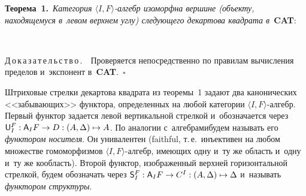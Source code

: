 \begin{multicols}{2}
  \smallskip
  
  \noindent
  \textbf{Теорема~1.}\ \textit{Категория $\langle I, F\rangle$-ал\-гебр 
изоморфна вершине (объекту, находящемуся в~левом верх\-нем углу) 
сле\-ду\-юще\-го декартова квад\-ра\-та в}~\textbf{CAT}:
  \vspace*{1pt}
  \begin{center}  
    \mbox{%
\epsfxsize=28.493mm
}

\end{center}
  
  \noindent
  Д\,о\,к\,а\,з\,а\,т\,е\,л\,ь\,с\,т\,в\,о\,.\ \ Проверяется непосредственно по 
правилам вы\-чис\-ле\-ния пределов и~экспонент в~\textbf{CAT}.~$\square$
  
  Штриховые стрелки декартова квад\-ра\-та из тео\-ре\-мы~1 задают два 
канонических <<за\-бы\-ва\-ющих>> функтора, определенных на любой категории 
$\langle I, F\rangle$-ал\-гебр. Первый функтор задается левой вертикальной 
стрелкой и~обозначается через ${\sf U}_I^F : {\sf A}_IF \hm\to D : (A, \Delta) 
\mapsto A$. По аналогии с~ал\-геб\-ра\-ми\linebreak будем называть его \textit{функтором 
носителя}. Он унивалентен (faithful, т.\,е.\ инъективен на любом множестве 
гомоморфизмов $\langle I, F\rangle$-ал\-гебр, име\-ющих одну и~ту же об\-ласть 
и~одну и~ту же кообласть). \mbox{Второй} функтор, изображенный верх\-ней 
горизонтальной стрел\-кой, будем обозначать через ${\sf S}_I^F : {\sf A}_I F 
\hm\to  C^I : (A, \Delta) \mapsto \Delta$ и~называть \textit{функтором 
структуры}.
  

\end{multicols}
